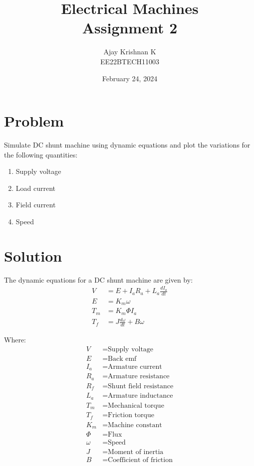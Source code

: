\documentclass[a4paper,12pt]{article}
\title{\textbf{Electrical Machines} \\
        \vspace*{0.3em}
        \large{Assignment 2} }
\author{Ajay Krishnan K \\  EE22BTECH11003}
\date{February 24, 2024}
\begin{document}
\maketitle

\section*{Problem}
Simulate DC shunt machine using dynamic equations and plot the variations for the following quantities:
\begin{enumerate}
    \item Supply voltage
    \item Load current
    \item Field current
    \item Speed
\end{enumerate}

\section*{Solution}
The dynamic equations for a DC shunt machine are given by:
\begin{align*}
    V   & = E + I_a R_a + L_a\frac{dI_a}{dt} \\
    E  & = K_m \omega                   \\
    T_m & = K_m \Phi I_a                   \\
    T_f & = J \frac{d\omega}{dt} + B\omega
\end{align*}

Where:
\begin{align*}
    V      & = \text{Supply voltage}          \\
    E      & = \text{Back emf}                \\
    I_a    & = \text{Armature current}        \\
    R_a    & = \text{Armature resistance}     \\
    R_f    & = \text{Shunt field resistance}  \\
    L_a    & = \text{Armature inductance}     \\
    T_m    & = \text{Mechanical torque}       \\
    T_f    & = \text{Friction torque}  \\
    K_m    & = \text{Machine constant}        \\
    \Phi   & = \text{Flux}                    \\
    \omega & = \text{Speed}                   \\
    J      & = \text{Moment of inertia}       \\
    B      & = \text{Coefficient of friction}
\end{align*}
\end{document}
